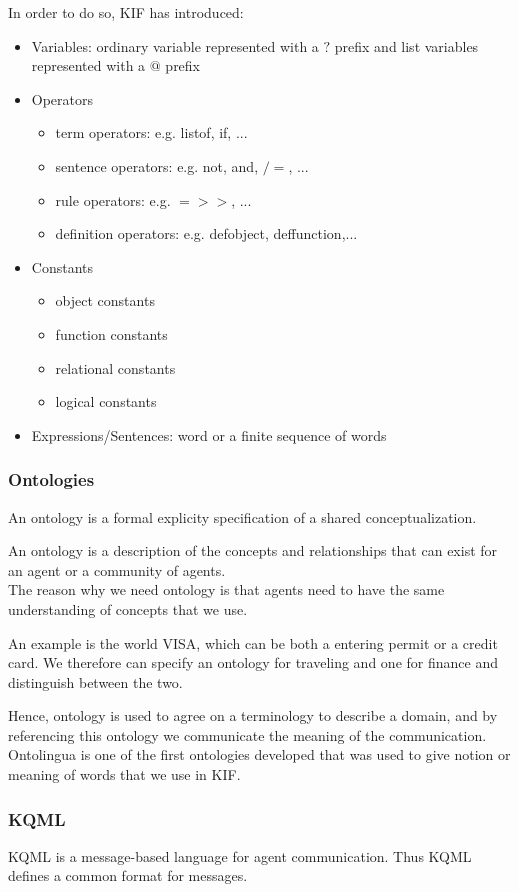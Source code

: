 In order to do so, KIF has introduced:
\begin{itemize}
\item Variables: ordinary variable represented with a $?$ prefix and list variables represented with a $@$ prefix
\item Operators
\begin{itemize}
\item term operators: e.g. listof, if, ...
\item sentence operators: e.g. not, and, $/=$, ...
\item rule operators: e.g. $=>>$, ...
\item definition operators: e.g. defobject, deffunction,...
\end{itemize}
\item Constants
\begin{itemize}
\item object constants
\item function constants
\item relational constants
\item logical constants
\end{itemize}
\item Expressions/Sentences: word or a finite sequence of words
\end{itemize}
\subsubsection{Ontologies}
An ontology is a formal explicity specification of a shared conceptualization.

An ontology is a description of the concepts and relationships that can exist for an agent or a community of agents. \\
The reason why we need ontology is that agents need to have the same understanding of concepts that we use.

An example is the world VISA, which can be both a entering permit or a credit card. We therefore can specify an ontology for traveling and one for finance and distinguish between the two.

Hence, ontology is used to agree on a terminology to describe a domain, and by referencing this ontology we communicate the meaning of the communication.\\
Ontolingua is one of the first ontologies developed that was used to give notion or meaning of words that we use in KIF.


\subsubsection{KQML}
KQML is a message-based language for agent communication. Thus KQML defines a common format for messages.

